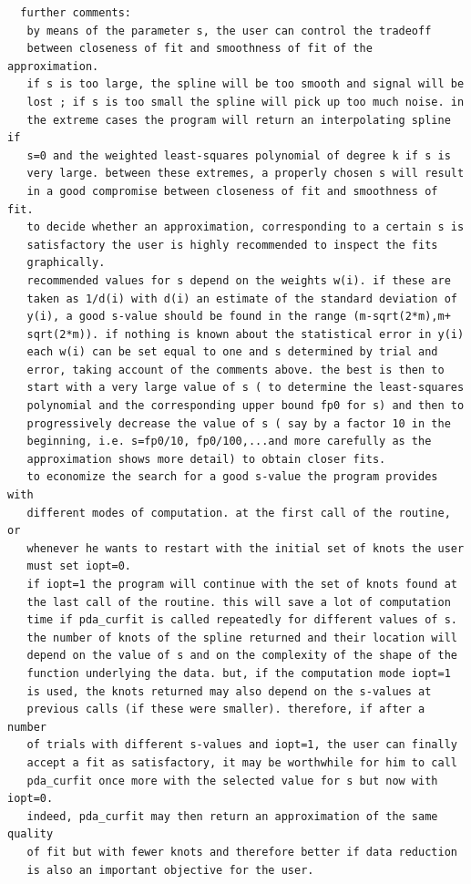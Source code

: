\documentclass[11pt,twoside]{article}
\begin{document}
\begin{verbatim}
  further comments:
   by means of the parameter s, the user can control the tradeoff
   between closeness of fit and smoothness of fit of the approximation.
   if s is too large, the spline will be too smooth and signal will be
   lost ; if s is too small the spline will pick up too much noise. in
   the extreme cases the program will return an interpolating spline if
   s=0 and the weighted least-squares polynomial of degree k if s is
   very large. between these extremes, a properly chosen s will result
   in a good compromise between closeness of fit and smoothness of fit.
   to decide whether an approximation, corresponding to a certain s is
   satisfactory the user is highly recommended to inspect the fits
   graphically.
   recommended values for s depend on the weights w(i). if these are
   taken as 1/d(i) with d(i) an estimate of the standard deviation of
   y(i), a good s-value should be found in the range (m-sqrt(2*m),m+
   sqrt(2*m)). if nothing is known about the statistical error in y(i)
   each w(i) can be set equal to one and s determined by trial and
   error, taking account of the comments above. the best is then to
   start with a very large value of s ( to determine the least-squares
   polynomial and the corresponding upper bound fp0 for s) and then to
   progressively decrease the value of s ( say by a factor 10 in the
   beginning, i.e. s=fp0/10, fp0/100,...and more carefully as the
   approximation shows more detail) to obtain closer fits.
   to economize the search for a good s-value the program provides with
   different modes of computation. at the first call of the routine, or
   whenever he wants to restart with the initial set of knots the user
   must set iopt=0.
   if iopt=1 the program will continue with the set of knots found at
   the last call of the routine. this will save a lot of computation
   time if pda_curfit is called repeatedly for different values of s.
   the number of knots of the spline returned and their location will
   depend on the value of s and on the complexity of the shape of the
   function underlying the data. but, if the computation mode iopt=1
   is used, the knots returned may also depend on the s-values at
   previous calls (if these were smaller). therefore, if after a number
   of trials with different s-values and iopt=1, the user can finally
   accept a fit as satisfactory, it may be worthwhile for him to call
   pda_curfit once more with the selected value for s but now with iopt=0.
   indeed, pda_curfit may then return an approximation of the same quality
   of fit but with fewer knots and therefore better if data reduction
   is also an important objective for the user.


\end{verbatim}
\end{document}
